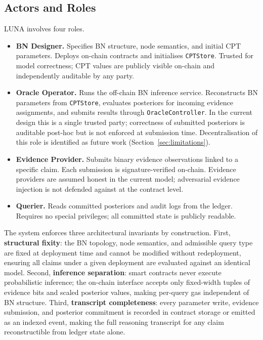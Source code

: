 \documentclass[journal]{IEEEtran}
\begin{document}
\subsection{Actors and Roles}

LUNA involves four roles.

\begin{itemize}

  \item \textbf{BN Designer.}
  Specifies BN structure, node semantics, and initial
  CPT parameters. Deploys on-chain contracts and
  initialises \texttt{CPTStore}. Trusted for model
  correctness; CPT values are publicly visible on-chain
  and independently auditable by any party.

  \item \textbf{Oracle Operator.}
  Runs the off-chain BN inference service. Reconstructs
  BN parameters from \texttt{CPTStore}, evaluates
  posteriors for incoming evidence assignments, and
  submits results through \texttt{OracleController}.
  In the current design this is a single trusted party;
  correctness of submitted posteriors is auditable
  post-hoc but is not enforced at submission time.
  Decentralisation of this role is identified as future
  work (Section~\ref{sec:limitations}).

  \item \textbf{Evidence Provider.}
  Submits binary evidence observations linked to a
  specific claim. Each submission is
  signature-verified on-chain. Evidence providers are
  assumed honest in the current model; adversarial
  evidence injection is not defended against at the
  contract level.

  \item \textbf{Querier.}
  Reads committed posteriors and audit logs from the
  ledger. Requires no special privileges; all committed
  state is publicly readable.

\end{itemize}

The system enforces three architectural invariants by
construction. First, \textbf{structural fixity}: the BN
topology, node semantics, and admissible query type are
fixed at deployment time and cannot be modified without
redeployment, ensuring all claims under a given
deployment are evaluated against an identical model.
Second, \textbf{inference separation}: smart contracts
never execute probabilistic inference; the on-chain
interface accepts only fixed-width tuples of evidence
bits and scaled posterior values, making per-query gas
independent of BN structure.
Third, \textbf{transcript completeness}: every parameter
write, evidence submission, and posterior commitment is
recorded in contract storage or emitted as an indexed
event, making the full reasoning transcript for any
claim reconstructible from ledger state alone.
\end{document}
